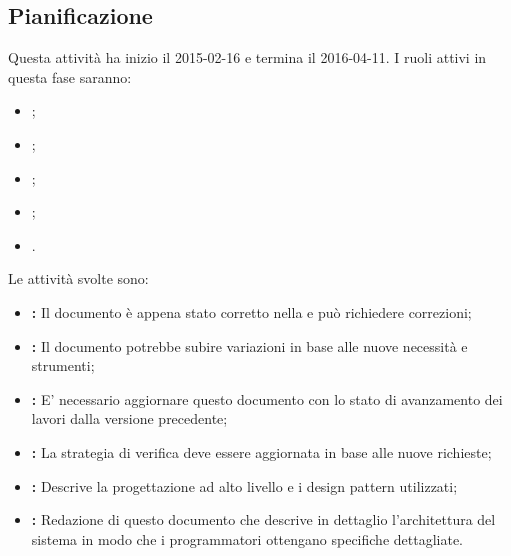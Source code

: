 \documentclass[12pt,a4paper]{article}
\begin{document}
\subsection{Pianificazione}

Questa attività ha inizio il 2015-02-16 e termina il 2016-04-11.
I ruoli attivi in questa fase saranno:

\begin{itemize}
	\item \PM;
	\item \AM;
	\item \AN;
	\item \PR;
	\item \VR.
\end{itemize}

Le attività svolte sono:

\begin{itemize}
	\item \textbf{\AdR:} 
	Il documento è appena stato corretto nella \RR
	e può richiedere correzioni;
	\item \textbf{\NdP:}
	Il documento potrebbe subire variazioni in base
	alle nuove necessità e strumenti;
	\item \textbf{\PdP:}
	E' necessario aggiornare questo documento con lo stato di avanzamento
	dei lavori dalla versione precedente;
	\item \textbf{\PdQ:}
	La strategia di verifica deve essere aggiornata in base 
	alle nuove richieste;
	\item \textbf{\ST:}
	Descrive la progettazione ad alto livello e i design pattern
	utilizzati;
	\item \textbf{\DP:}
	Redazione di questo documento che descrive in dettaglio l'architettura
	del sistema in modo che i programmatori ottengano specifiche dettagliate.
\end{itemize}
\end{document}
